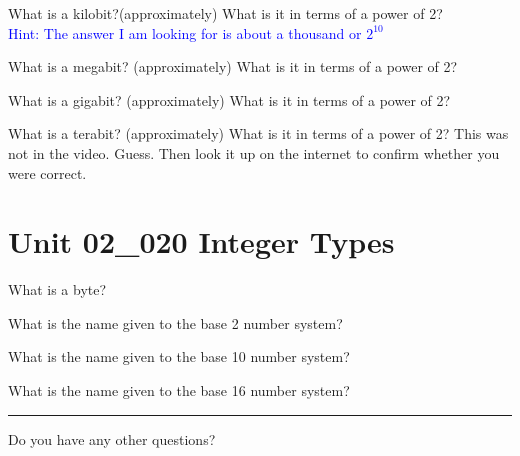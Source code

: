 \documentclass[letterpaper,12pt]{exam}
\newcommand{\unit}{Unit 02}
\begin{document}
\begin{questions}
\begin{samepage}
\begin{itemize}
	\end{itemize}
\end{samepage}

\begin{samepage}
	\question What is a kilobit?(approximately) What is it in terms of a power of 2?\\
	\textcolor{blue}{Hint: The answer I am looking for is about a thousand or $2^{10}$}
	\vspace{5mm}
\end{samepage}

\begin{samepage}
	\question What is a megabit? (approximately) What is it in terms of a power of 2?
	\vspace{5mm}
\end{samepage}

\begin{samepage}
	\question What is a gigabit? (approximately) What is it in terms of a power of 2?
	\vspace{5mm}
\end{samepage}

\begin{samepage}
	\question What is a terabit? (approximately) What is it in terms of a power of 2?  This was not in the video.  Guess.  Then look it up on the internet to confirm whether you were correct.
	\vspace{5mm}
\end{samepage}

\section*{\unit\_020 Integer Types} %
\begin{samepage}
	\question What is a byte?
	\vspace{5mm}
\end{samepage}
\begin{samepage}
	\question What is the name given to the base 2 number system?
	\vspace{5mm}
\end{samepage}
\begin{samepage}
	\question What is the name given to the base 10 number system?
	\vspace{5mm}
\end{samepage}
\begin{samepage}
	\question What is the name given to the base 16 number system?
	\vspace{5mm}
\end{samepage}


\hrule
\vspace{5mm}
\begin{samepage}
	\question Do you have any other questions?
	\vspace{30mm}
\end{samepage}


\end{questions}
\end{document}
